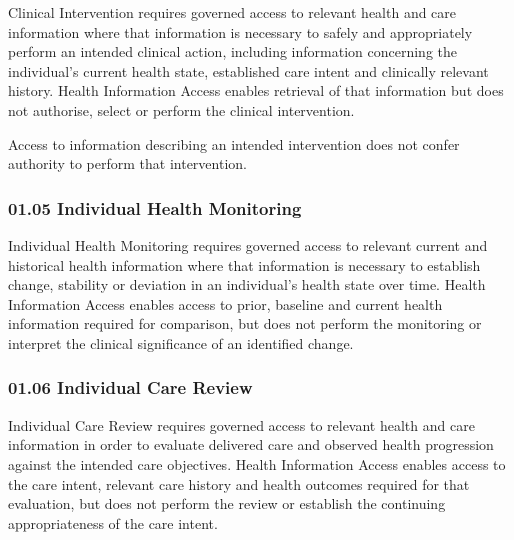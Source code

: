 \texttt{}

\label{rad:b2-1:84}

Clinical Intervention requires governed access to relevant health and care information where that information is necessary to safely and appropriately perform an intended clinical action, including information concerning the individual's current health state, established care intent and clinically relevant history. Health Information Access enables retrieval of that information but does not authorise, select or perform the clinical intervention.

\label{rad:b2-1:91}

Access to information describing an intended intervention does not confer authority to perform that intervention.

\label{rad:b2-1:94}
\subsubsection*{01.05 Individual Health Monitoring}
\label{rad:b2-1:96}

\texttt{}

\label{rad:b2-1:98}

Individual Health Monitoring requires governed access to relevant current and historical health information where that information is necessary to establish change, stability or deviation in an individual's health state over time. Health Information Access enables access to prior, baseline and current health information required for comparison, but does not perform the monitoring or interpret the clinical significance of an identified change.

\label{rad:b2-1:105}
\subsubsection*{01.06 Individual Care Review}
\label{rad:b2-1:107}

\texttt{}

\label{rad:b2-1:109}

Individual Care Review requires governed access to relevant health and care information in order to evaluate delivered care and observed health progression against the intended care objectives. Health Information Access enables access to the care intent, relevant care history and health outcomes required for that evaluation, but does not perform the review or establish the continuing appropriateness of the care intent.


